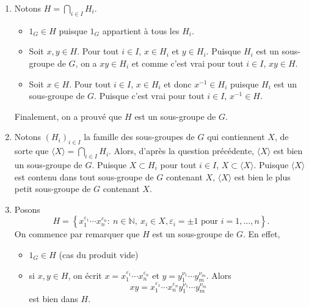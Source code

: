 \documentclass[11pt,a4paper]{article}
\newcommand{\veps}{\varepsilon}\newcommand{\mcu}{\mathcal{U}}
\begin{document}
	\begin{corrige}
		\begin{enumerate}
			
			\item  Notons $H=\bigcap_{i\in I}H_i$. 
			
			\begin{itemize}
				
				\item   $1_G\in H$ puisque $1_G$ appartient à tous les $H_i$. 
				
				\item  Soit $x,y\in H$. Pour tout $i\in I$, $x\in H_i$ et $y\in H_i$. Puisque $H_i$ est un sous-groupe de $G$, on a $xy\in H_i$ et comme c'est vrai pour tout $i\in I$, $xy\in H$. 
				
				\item  Soit $x\in H$. Pour tout $i\in I$, $x\in H_i$ et donc $x^{-1}\in H_i$ puisque $H_i$ est un sous-groupe de $G$. Puisque c'est vrai pour tout $i\in I$, $x^{-1}\in H$. 
				
			\end{itemize}
			
			Finalement, on a prouvé que $H$ est un sous-groupe de $G$. 
			
			\item  Notons $(H_i)_{i\in I}$ la famille des sous-groupes de $G$ qui contiennent $X$, de sorte que $\langle X\rangle=\bigcap_{i\in I}H_i$. Alors, d'après la question précédente, $\langle X\rangle$ est bien un sous-groupe de $G$. Puisque $X\subset H_i$ pour tout $i\in I$, $X\subset \langle X\rangle$. Puisque $\langle X\rangle$ est contenu dans tout sous-groupe de $G$ contenant $X$, $\langle X\rangle$ est bien le plus petit sous-groupe de $G$ contenant $X$.
			
			\item  Posons
			$$H=\left\{x_1^{\veps_1}\cdots x_n^{\veps_n}:\ n\in\mathbb N,\ x_i\in X, \veps_i=\pm 1\textrm{ pour }i=1,\dots,n\right\}.$$
			On commence par remarquer que $H$ est un sous-groupe de $G$. En effet, 
			
			\begin{itemize}
				
				\item  $1_G\in H$ (cas du produit vide)
				
				\item  si $x,y\in H$, on écrit $x=x_1^{\veps_1}\cdots x_n^{\veps_n}$ et $y=y_1^{\nu_1}\cdots y_m^{\nu_m}$. Alors 
				$$xy=x_1^{\veps_1}\cdots x_n^{\veps_n}y_1^{\nu_1}\cdots y_m^{\nu_m}$$
				est bien dans $H$.
				

\end{itemize}
\end{enumerate}
\end{corrige}
\end{document}
